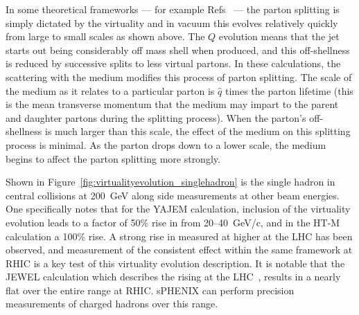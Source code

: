 In some theoretical frameworks --- for example
Refs~\cite{Renk:2013rla,Majumder:2011uk,Majumder:2014gda} --- the
parton splitting is simply dictated by the virtuality and in vacuum
this evolves relatively quickly from large to small scales as shown
above.  The $Q$ evolution means that the jet starts out being
considerably off mass shell when produced, and this off-shellness is
reduced by successive splits to less virtual partons.  In these
calculations, the scattering with the medium modifies this process of
parton splitting.  The scale of the medium as it relates to a
particular parton is $\hat{q}$ times the parton lifetime (this is the
mean transverse momentum that the medium may impart to the parent and
daughter partons during the splitting process). When the parton's
off-shellness is much larger than this scale, the effect of the medium
on this splitting process is minimal. As the parton drops down to a
lower scale, the medium begins to affect the parton splitting more
strongly.

Shown in Figure~\ref{fig:virtualityevolution_singlehadron} is the
single hadron \raa in central \auau collisions at 200~GeV along
side measurements at other beam energies.  One specifically notes that
for the YAJEM calculation, inclusion of the virtuality evolution leads
to a factor of 50\% rise in \raa from 20--40~GeV/c, and in the HT-M
calculation a 100\% rise. A strong rise in \raa measured at
higher \pt at the LHC has been observed, and measurement of the
consistent effect within the same framework at RHIC is a key test of
this virtuality evolution description. It is notable that the JEWEL
calculation which describes the rising \raa at the
LHC~\cite{Zapp:2013vla}, results in a nearly flat \raa over the entire
\pt range at RHIC. sPHENIX can perform precision measurements of
charged hadrons over this \pt range.

